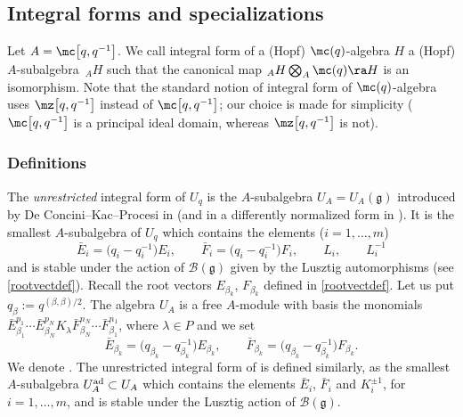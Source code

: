 \subsection{Integral forms and specializations}\label{INTEG} Let $A=\mc\big[q,q^{-1}\big]$. We call integral form of a (Hopf) $\mc(q)$-algebra $H$ a (Hopf) $A$-subalgebra~${}_AH$ such that the canonical map ${}_AH\bigotimes_A \mc(q) \ra H$ is an isomorphism. Note that the standard notion of integral form of $\mc(q)$-algebra uses $\mz\big[q,q^{-1}\big]$ instead of $\mc\big[q,q^{-1}\big]$; our choice is made for simplicity ($\mc\big[q,q^{-1}\big]$ is a principal ideal domain, whereas $\mz\big[q,q^{-1}\big]$ is not).

\subsubsection{Definitions}\label{defintform} The {\it unrestricted} integral form of $U_q$ is the $A$-subalgebra $U_A = U_A(\mathfrak{g})$ introduced by De Concini--Kac--Procesi in \cite[Section 12]{DC-K-P2} (and in a differently normalized form in \cite{DC-K,DC-K-P1}). It is the smallest $A$-subalgebra of $U_q$ which contains the elements ($i=1,\dots,m$)
\begin{equation}\label{normgen0}
\bar{E}_i = \big(q_i-q_i^{-1}\big)E_i,\qquad \bar{F}_i = \big(q_i-q_i^{-1}\big)F_i,\qquad L_i,\qquad L_i^{-1}
\end{equation}
and is stable under the action of $\mathcal{B}(\mathfrak{g})$ given by the Lusztig automorphisms (see \eqref{rootvectdef}). Recall the root vectors $E_{\beta_k}$, $F_{\beta_k}$ defined in \eqref{rootvectdef}. Let us put $q_\beta := q^{(\beta,\beta)/2}$. The algebra $U_A$ is a free $A$-module with basis the monomials $\bar{E}_{\beta_1}^{p_1}\cdots \bar{E}_{\beta_N}^{p_N}K_\lambda \bar{F}_{\beta_N}^{n_N}\cdots \bar{F}_{\beta_1}^{n_1}$, where $\lambda \in P$ and we set
\[\bar{E}_{\beta_k}= \big(q_{\beta_k}-q_{\beta_k}^{-1}\big)E_{\beta_k},\qquad \bar{F}_{\beta_k}= \big(q_{\beta_k}-q_{\beta_k}^{-1}\big)F_{\beta_k}.\]
We denote .
The unrestricted integral form of  is defined similarly, as the smallest $A$-subalgebra $U_A^{\rm ad} \subset U_A$ which contains the elements $\bar{E}_i$, $\bar{F}_i$ and $K_i^{\pm 1}$, for $i=1,\dots,m$, and is stable under the Lusztig action of $\mathcal{B}(\mathfrak{g})$.

